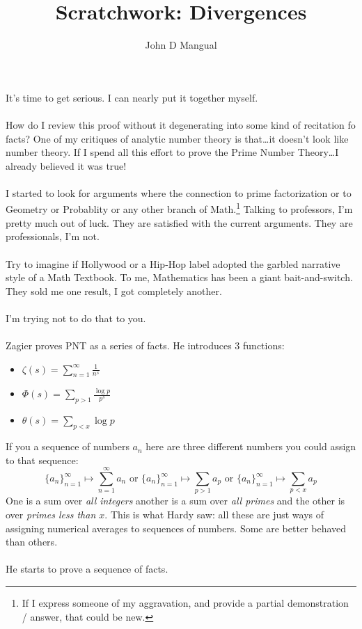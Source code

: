 \documentclass[12pt]{article}
\title{Scratchwork: Divergences}
\author{John D Mangual}
\date{}
\begin{document}
\selectfont \fontsize{12.5}{15}\selectfont

\maketitle

\noindent It's time to get serious.  I can nearly put it together myself.  \\ \\
How do I review this proof without it degenerating into some kind of recitation fo facts? One of my critiques of analytic number theory is that\dots it doesn't look like number theory.  If I spend all this effort to prove the Prime Number Theory\dots I already believed it was true! \\ \\
I started to look for arguments where the connection to prime factorization or to Geometry or Probablity or any other branch of Math.\footnote{If I express someone of my aggravation, and provide a partial demonstration / answer, that could be new.}  Talking to professors, I'm pretty much out of luck. They are satisfied with the current arguments.  They are professionals, I'm not.\\ \\
Try to imagine if Hollywood or a Hip-Hop label adopted the garbled narrative style of a Math Textbook.  To me, Mathematics has been a giant bait-and-switch.  They sold me one result, I got completely another.   \\ \\ 
I'm trying not to do that to you.  \\ \\
Zagier proves PNT as a series of facts.  He introduces 3 functions:
\begin{itemize}
\item $\displaystyle \zeta(s) = \sum_{n=1}^\infty \frac{1}{n^s}$
\item $\displaystyle \Phi(s) = \sum_{p > 1} \frac{\log p}{p^s}$
\item $\displaystyle \theta(s) = \sum_{p < x} \log p $
\end{itemize}
If you a sequence of numbers $a_n$ here are three different numbers you could assign to that sequence:
$$ \{ a_n\}_{n=1}^\infty \mapsto \sum_{n=1}^\infty a_n 
\text{ or } 
\{ a_n\}_{n=1}^\infty \mapsto \sum_{p > 1} a_p 
\text{ or }
\{ a_n\}_{n=1}^\infty \mapsto \sum_{p < x} a_p $$
One is a sum over \textit{all integers} another is a sum over \textit{all primes} and the other is over \textit{primes less than $x$}.  This is what Hardy saw: all these are just ways of assigning numerical averages to sequences of numbers.  Some are better behaved than others. \\ \\
He starts to prove a sequence of facts.
\end{document}
